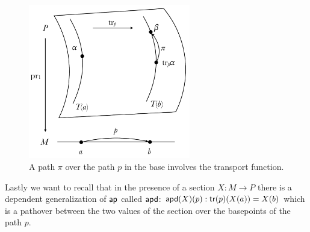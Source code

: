 \begin{figure}[H]
\centering
\includegraphics[width=200pt]{figs/pathovers.pdf}
\caption{A path \( \pi \) over the path \( p \) in the base involves the transport function.}
\label{fig:pathovers}
\end{figure}

Lastly we want to recall that in the presence of a section \( X:M\to P \) there is a dependent generalization of \( \mathsf{ap} \) called \( \mathsf{apd} \): \( \mathsf{apd}(X)(p):\mathsf{tr}(p)(X(a))=X(b) \) which is a pathover between the two values of the section over the basepoints of the path \( p \).
